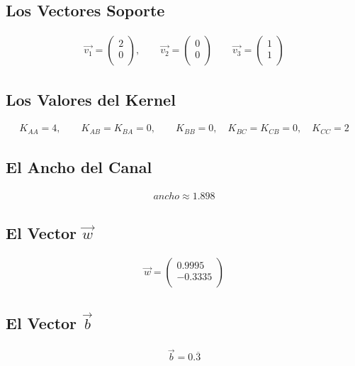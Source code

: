 \documentclass[fleqn]{llncs}
\begin{document}
\subsection{Los Vectores Soporte}
\begin{align*}
	\overrightarrow{v_1} =
	\begin{pmatrix}
		2 \\
		0 \\
	\end{pmatrix},
	\qquad
	\overrightarrow{v_2} =
	\begin{pmatrix}
		0 \\
		0 \\
	\end{pmatrix}
	\qquad
	\overrightarrow{v_3} =
	\begin{pmatrix}
		1 \\
		1 \\
	\end{pmatrix}
\end{align*}

\subsection{Los Valores del Kernel}
\begin{align*}
	K_{AA} = 4,
	\qquad
	K_{AB} = K_{BA} = 0,
	\qquad
	K_{BB} = 0,
	\quad
	K_{BC} = K_{CB} = 0,
	\quad
	K_{CC} = 2
\end{align*}

\subsection{El Ancho del Canal}
\begin{align*}
	ancho \approx 1.898
\end{align*}

\subsection{El Vector $\overrightarrow{w}$}
\begin{align*}
	\overrightarrow{w} =
	\begin{pmatrix}
		0.9995 \\
		-0.3335 \\
	\end{pmatrix}
\end{align*}

\subsection{El Vector $\overrightarrow{b}$}
\begin{align*}
	\overrightarrow{b} = 0.\overline{3}
\end{align*}
\end{document}
